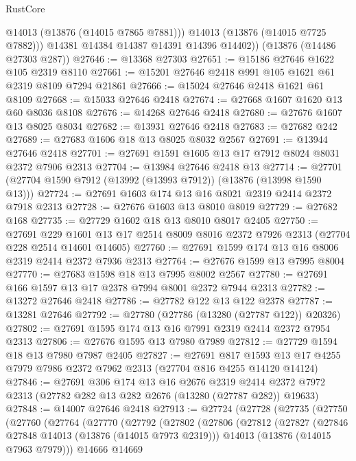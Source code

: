 \begin{lexlean}{RustCore}
\begin{coremodule}
            @14013
            (@13876 (@14015 @7865 @7881)))
          @14013
          (@13876 (@14015 @7725 @7882)))
        @14381
        @14384
        @14387
        @14391
        @14396
        @14402))
    (@13876 (@14486 @27303 @287))
@27646 := @13368 @27303
@27651 := @15186 @27646 @1622 @105 @2319 @8110
@27661 := @15201 @27646 @2418 @991 @105 @1621 @61 @2319 @8109 @7294 @21861
@27666 := @15024 @27646 @2418 @1621 @61 @8109
@27668 := @15033 @27646 @2418
@27674 := @27668 @1607 @1620 @13 @60 @8036 @8108
@27676 := @14268 @27646 @2418
@27680 := @27676 @1607 @13 @8025 @8034
@27682 := @13931 @27646 @2418
@27683 := @27682 @242
@27689 := @27683 @1606 @18 @13 @8025 @8032 @2567
@27691 := @13944 @27646 @2418
@27701 := @27691 @1591 @1605 @13 @17 @7912 @8024 @8031 @2372 @7906 @2313
@27704 := @13984 @27646 @2418 @13
@27714 := @27701 (@27704 @1590 @7912 (@13992 (@13993 @7912)) (@13876 (@13998 @1590 @13)))
@27724 := @27691 @1603 @174 @13 @16 @8021 @2319 @2414 @2372 @7918 @2313
@27728 := @27676 @1603 @13 @8010 @8019
@27729 := @27682 @168
@27735 := @27729 @1602 @18 @13 @8010 @8017 @2405
@27750 := @27691
    @229
    @1601
    @13
    @17
    @2514
    @8009
    @8016
    @2372
    @7926
    @2313
    (@27704 @228 @2514 @14601 @14605)
@27760 := @27691 @1599 @174 @13 @16 @8006 @2319 @2414 @2372 @7936 @2313
@27764 := @27676 @1599 @13 @7995 @8004
@27770 := @27683 @1598 @18 @13 @7995 @8002 @2567
@27780 := @27691 @166 @1597 @13 @17 @2378 @7994 @8001 @2372 @7944 @2313
@27782 := @13272 @27646 @2418
@27786 := @27782 @122 @13 @122 @2378
@27787 := @13281 @27646
@27792 := @27780 (@27786 (@13280 (@27787 @122)) @20326)
@27802 := @27691 @1595 @174 @13 @16 @7991 @2319 @2414 @2372 @7954 @2313
@27806 := @27676 @1595 @13 @7980 @7989
@27812 := @27729 @1594 @18 @13 @7980 @7987 @2405
@27827 := @27691
    @817
    @1593
    @13
    @17
    @4255
    @7979
    @7986
    @2372
    @7962
    @2313
    (@27704 @816 @4255 @14120 @14124)
@27846 := @27691
    @306
    @174
    @13
    @16
    @2676
    @2319
    @2414
    @2372
    @7972
    @2313
    (@27782 @282 @13 @282 @2676 (@13280 (@27787 @282)) @19633)
@27848 := @14007 @27646 @2418
@27913 := @27724
    (@27728
      (@27735
        (@27750
          (@27760
            (@27764
              (@27770
                (@27792
                  (@27802
                    (@27806
                      (@27812
                        (@27827
                          (@27846 @27848 @14013 (@13876 (@14015 @7973 @2319)))
                          @14013
                          (@13876 (@14015 @7963 @7979)))
                        @14666
                        @14669

\end{coremodule}
\end{lexlean}
